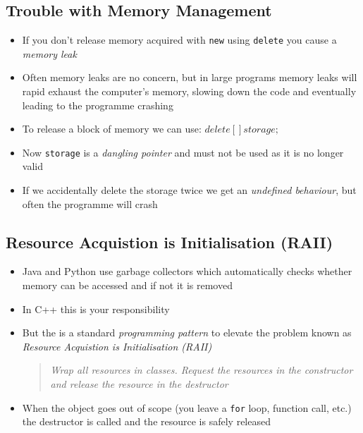 
\begin{slide}
\section[-2]{Trouble with Memory Management}

\begin{PauseHighLight}
  \begin{itemize}
  \item If you don't release memory acquired with \texttt{new} using
    \texttt{delete} you cause a \emph{memory leak}\pause
  \item Often memory leaks are no concern, but in large programs
    memory leaks will rapid exhaust the computer's memory, slowing
    down the code and eventually leading to the programme
    crashing\pause
  \item To release a block of memory we can use: \jl$delete[] storage;$\pause
  \item Now \texttt{storage} is a \emph{dangling pointer} and must not
    be used as it is no longer valid\pause
  \item If we accidentally delete the storage twice we get an
    \textit{undefined behaviour}\pause, but often the programme will crash\pause
  \end{itemize}
\end{PauseHighLight}

\end{slide}




\begin{slide}
\section{Resource Acquistion is Initialisation (RAII)}

\begin{PauseHighLight}
  \begin{itemize}
  \item Java and Python use garbage collectors which automatically
    checks whether memory can be accessed and if not it is
    removed\pause
  \item In C++ this is your responsibility\pause
  \item But the is a standard \emph{programming pattern} to elevate
    the problem known as \emph{Resource Acquistion is Initialisation
      (RAII)}\pause
    \begin{quote}
      \it Wrap all resources in classes.  Request the resources in the
      constructor and release the resource in the destructor\pause
    \end{quote}
  \item When the object goes out of scope (you leave a \texttt{for}
    loop, function call, etc.) the destructor is called and the
    resource is safely released\pause
  \end{itemize}
\end{PauseHighLight}

\end{slide}

